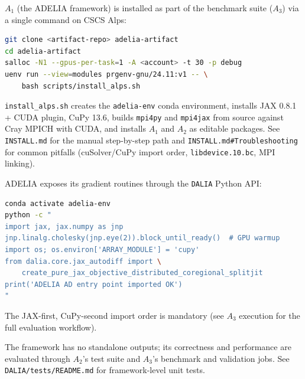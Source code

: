 \documentclass[nonacm,sigconf]{acmart}
\begin{document}

\appendixAE


\artin

$A_1$ (the ADELIA framework) is installed as part of the
benchmark suite ($A_3$) via a single command on CSCS Alps:

\begin{lstlisting}[language=bash]
git clone <artifact-repo> adelia-artifact
cd adelia-artifact
salloc -N1 --gpus-per-task=1 -A <account> -t 30 -p debug
uenv run --view=modules prgenv-gnu/24.11:v1 -- \
    bash scripts/install_alps.sh
\end{lstlisting}

\noindent
\texttt{install\_alps.sh} creates the \texttt{adelia-env} conda
environment, installs JAX 0.8.1 + CUDA plugin, CuPy 13.6, builds
\texttt{mpi4py} and \texttt{mpi4jax} from source against Cray MPICH
with CUDA, and installs $A_1$ and $A_2$ as editable packages.
See \texttt{INSTALL.md} for the manual step-by-step path and
\texttt{INSTALL.md\#Troubleshooting} for common pitfalls
(cuSolver/CuPy import order, \texttt{libdevice.10.bc}, MPI linking).

\artcomp

ADELIA exposes its gradient routines through the \texttt{DALIA}
Python API:
\begin{lstlisting}[language=bash]
conda activate adelia-env
python -c "
import jax, jax.numpy as jnp
jnp.linalg.cholesky(jnp.eye(2)).block_until_ready()  # GPU warmup
import os; os.environ['ARRAY_MODULE'] = 'cupy'
from dalia.core.jax_autodiff import \
    create_pure_jax_objective_distributed_coregional_splitjit
print('ADELIA AD entry point imported OK')
"
\end{lstlisting}

\noindent
The JAX-first, CuPy-second import order is mandatory (see $A_3$
execution for the full evaluation workflow).

\artout

The framework has no standalone outputs; its correctness and
performance are evaluated through $A_2$'s test suite and $A_3$'s
benchmark and validation jobs. See \texttt{DALIA/tests/README.md}
for framework-level unit tests.
\end{document}
